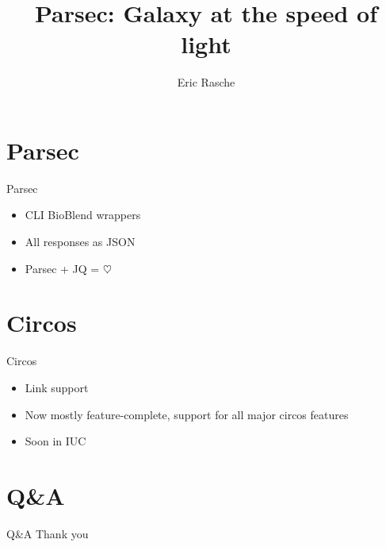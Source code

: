\documentclass[12pt]{phage3slides} %
\title[Parsec]{Parsec: Galaxy at the speed of light}
\author[ER]{Eric Rasche}
\begin{document}
\frame{\titlepage}


\section{Parsec}
\begin{frame}{Parsec}
	\begin{itemize}
		\item CLI BioBlend wrappers
		\item All responses as JSON
		\item Parsec + JQ = $\heartsuit$
	\end{itemize}
\end{frame}



\section{Circos}
\begin{frame}{Circos}
	\begin{itemize}
		\item Link support
		\item Now mostly feature-complete, support for all major circos features
		\item Soon in IUC
	\end{itemize}
\end{frame}



\section{Q\&A}
\begin{frame}{Q\&A}
	Thank you \\\ \\
	\begin{center}
		\begin{tabular}{rl}
			\end{tabular}\\[1cm]
			\fundingNSFABIannotation
	\end{center}
\end{frame}
\end{document}
